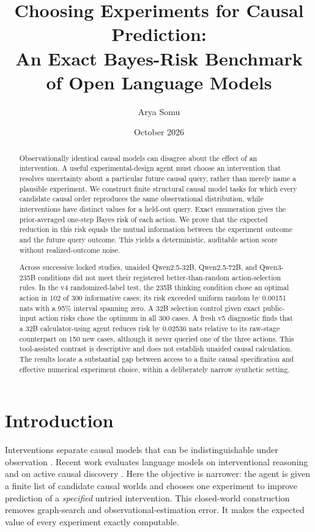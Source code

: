 \documentclass[10pt]{article}
\title{Choosing Experiments for Causal Prediction:\\
An Exact Bayes-Risk Benchmark of Open Language Models}
\author{Arya Somu}
\date{October 2026}
\begin{document}
\maketitle

\begin{abstract}
Observationally identical causal models can disagree about the effect of an intervention. A useful experimental-design agent must choose an intervention that resolves uncertainty about a particular future causal query, rather than merely name a plausible experiment. We construct finite structural causal model tasks for which every candidate causal order reproduces the same observational distribution, while interventions have distinct values for a held-out query. Exact enumeration gives the prior-averaged one-step Bayes risk of each action. We prove that the expected reduction in this risk equals the mutual information between the experiment outcome and the future query outcome. This yields a deterministic, auditable action score without realized-outcome noise.

Across successive locked studies, unaided Qwen2.5-32B, Qwen2.5-72B, and Qwen3-235B conditions did not meet their registered better-than-random action-selection rules. In the v4 randomized-label test, the 235B thinking condition chose an optimal action in 102 of 300 informative cases; its risk exceeded uniform random by 0.00151 nats with a 95\% interval spanning zero. A 32B selection control given exact public-input action risks chose the optimum in all 300 cases. A fresh v5 diagnostic finds that a 32B calculator-using agent reduces risk by 0.02536 nats relative to its raw-stage counterpart on 150 new cases, although it never queried one of the three actions. This tool-assisted contrast is descriptive and does not establish unaided causal calculation. The results locate a substantial gap between access to a finite causal specification and effective numerical experiment choice, within a deliberately narrow synthetic setting.
\end{abstract}

\section{Introduction}
Interventions separate causal models that can be indistinguishable under observation \cite{pearl1995,hauser2012}. Recent work evaluates language models on interventional reasoning \cite{kasetty2024} and on active causal discovery \cite{deb2026}. Here the objective is narrower: the agent is given a finite list of candidate causal worlds and chooses one experiment to improve prediction of a \emph{specified} untried intervention. This closed-world construction removes graph-search and observational-estimation error. It makes the expected value of every experiment exactly computable.
\end{document}
